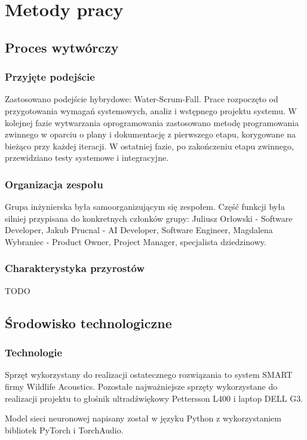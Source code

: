 \documentclass{sprz}
\begin{document}
\chapter{Metody pracy}

\section{Proces wytwórczy}

\subsection{Przyjęte podejście}
Zastosowano podejście hybrydowe: Water-Scrum-Fall. Prace rozpoczęto od przygotowania wymagań systemowych, analiz i wstępnego projektu systemu. W kolejnej fazie wytwarzania oprogramowania zastosowano metodę programowania zwinnego w oparciu o plany i dokumentację z pierwszego etapu, korygowane na bieżąco przy każdej iteracji. W ostatniej fazie, po zakończeniu etapu zwinnego, przewidziano testy systemowe i integracyjne.

\subsection{Organizacja zespołu}
Grupa inżynierska była samoorganizującym się zespołem. Część funkcji była silniej przypisana do konkretnych członków grupy:
Juliusz Orłowski - Software Developer, Jakub Prucnal - AI Developer, Software Engineer, Magdalena Wybraniec - Product Owner, Project Manager, specjalista dziedzinowy. 

\subsection{Charakterystyka przyrostów}
TODO

\section{Środowisko technologiczne}

\subsection{Technologie}
Sprzęt wykorzystany do realizacji ostatecznego rozwiązania to system SMART firmy Wildlife Acoustics. Pozostałe najważniejsze sprzęty wykorzystane do realizacji projektu to głośnik ultradźwiękowy Pettersson L400 i laptop DELL G3.

Model sieci neuronowej napisany został w języku Python z wykorzystaniem bibliotek PyTorch i TorchAudio.
\end{document}
